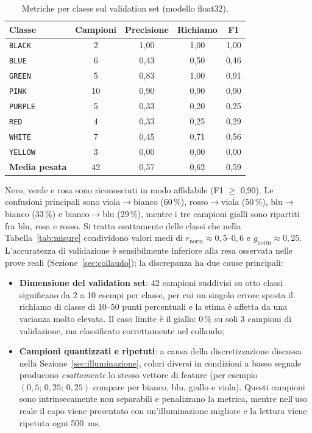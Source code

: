 \documentclass[11pt,a4paper,twoside,openany]{report}
\newcommand{\rn}{r_{\mathrm{norm}}}
\newcommand{\gn}{g_{\mathrm{norm}}}
\begin{document}
\begin{table}[htbp]
\centering
\caption{Metriche per classe sul validation set (modello float32).}
\label{tab:metriche}
\begin{tabular}{@{}lcccc@{}}
\toprule
\textbf{Classe} & \textbf{Campioni} & \textbf{Precisione} & \textbf{Richiamo} & \textbf{F1} \\
\midrule
\texttt{BLACK}  & 2  & 1,00 & 1,00 & 1,00 \\
\texttt{BLUE}   & 6  & 0,43 & 0,50 & 0,46 \\
\texttt{GREEN}  & 5  & 0,83 & 1,00 & 0,91 \\
\texttt{PINK}   & 10 & 0,90 & 0,90 & 0,90 \\
\texttt{PURPLE} & 5  & 0,33 & 0,20 & 0,25 \\
\texttt{RED}    & 4  & 0,33 & 0,25 & 0,29 \\
\texttt{WHITE}  & 7  & 0,45 & 0,71 & 0,56 \\
\texttt{YELLOW} & 3  & 0,00 & 0,00 & 0,00 \\
\midrule
\textbf{Media pesata} & 42 & 0,57 & 0,62 & 0,59 \\
\bottomrule
\end{tabular}
\end{table}

Nero, verde e rosa sono riconosciuti in modo affidabile (F1 $\geq$
0,90). Le confusioni principali sono viola$\to$bianco (60\,\%),
rosso$\to$viola (50\,\%), blu$\to$bianco (33\,\%) e bianco$\to$blu
(29\,\%), mentre i tre campioni gialli sono ripartiti fra blu, rosa e
rosso. Si tratta esattamente delle classi che nella
Tabella~\ref{tab:misure} condividono valori medi di $\rn \approx
0{,}5$--$0{,}6$ e $\gn \approx 0{,}25$. L'accuratezza di validazione è
sensibilmente inferiore alla resa osservata nelle prove reali
(Sezione~\ref{sec:collaudo}); la discrepanza ha due cause principali:

\begin{itemize}
  \item \textbf{Dimensione del validation set}: 42 campioni suddivisi su
        otto classi significano da 2 a 10 esempi per classe, per cui un
        singolo errore sposta il richiamo di classe di 10--50 punti
        percentuali e la stima è affetta da una varianza molto elevata.
        Il caso limite è il giallo: 0\,\% su soli 3 campioni di
        validazione, ma classificato correttamente nel collaudo;
  \item \textbf{Campioni quantizzati e ripetuti}: a causa della
        discretizzazione discussa nella Sezione~\ref{sec:illuminazione},
        colori diversi in condizioni a basso segnale producono
        \emph{esattamente} lo stesso vettore di feature (per esempio
        $(0{,}5;\,0{,}25;\,0{,}25)$ compare per bianco, blu, giallo e
        viola). Questi campioni sono intrinsecamente non separabili e
        penalizzano la metrica, mentre nell'uso reale il capo viene
        presentato con un'illuminazione migliore e la lettura viene
        ripetuta ogni \SI{500}{ms}.
\end{itemize}
\end{document}
